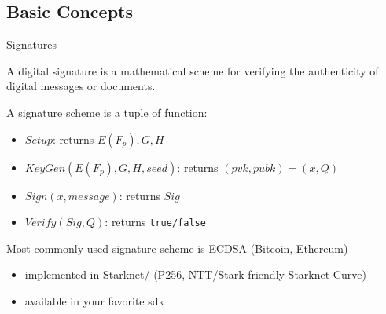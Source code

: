 \documentclass[aspectratio=43]{beamer}
\begin{document}
    \subsection{Basic Concepts}
    \begin{frame}{Signatures}
     
     A digital signature is a mathematical scheme for verifying the authenticity of digital messages or documents.
     
     \begin{definition}
     A signature scheme is a tuple of function:
     \begin{itemize}
     \item $Setup$: returns $E(F_p), G, H$
     \item $KeyGen(E(F_p), G, H, seed)$: returns $(pvk,pubk)=(x,Q)$
     \item $Sign(x,message)$: returns $Sig$ 
     \item $Verify(Sig,Q)$: returns {\tt true/false}
     \end{itemize}
     
     \end{definition}
     Most commonly used signature scheme is ECDSA (Bitcoin, Ethereum)
     \begin{itemize}
     \item implemented in Starknet/\href{https://github.com/starkware-libs/cairo-lang/tree/master/src/starkware/cairo/common}{} (P256, NTT/Stark friendly Starknet Curve)
     \item available in your favorite sdk
     \href{https://developers.ledger.com/docs/nano-app/crypto-api/ox__ec_8h/}{}
     
     \end{itemize} 
    
\end{frame}
\end{document}
